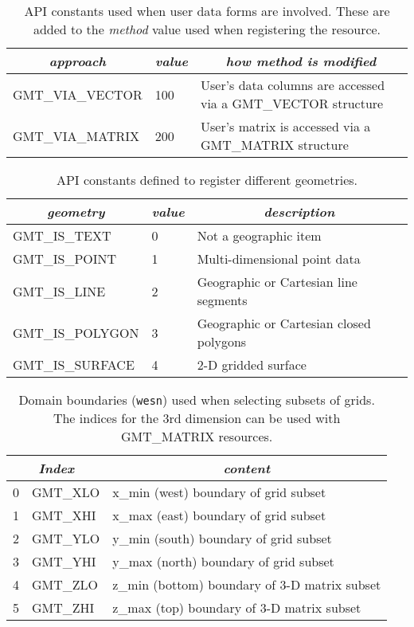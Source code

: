 \documentclass[11pt]{report}
\begin{document}
\begin{table}[h]
\small
\centering
\begin{tabular}{|l|l|l|} \hline
\multicolumn{1}{|c|}{\emph{approach}} & \multicolumn{1}{c|}{\emph{value}} & \multicolumn{1}{c|}{\emph{how method is modified}} \\ \hline
GMT\_VIA\_VECTOR	&	100	&       User's data columns are accessed via a GMT\_VECTOR structure \\ \hline
GMT\_VIA\_MATRIX	&	200	&       User's matrix is accessed via a GMT\_MATRIX structure \\ \hline
\end{tabular}
\caption{API constants used when user data forms are involved.  These are added
to the \emph{method} value used when registering the resource.}
\label{tbl:via}
\end{table}

\begin{table}[h]
\small
\centering
\begin{tabular}{|l|l|l|} \hline
\multicolumn{1}{|c|}{\emph{geometry}} & \multicolumn{1}{c|}{\emph{value}} & \multicolumn{1}{c|}{\emph{description}} \\ \hline
GMT\_IS\_TEXT		&	0	&       Not a geographic item \\ \hline
GMT\_IS\_POINT		&	1	&       Multi-dimensional point data \\ \hline
GMT\_IS\_LINE		&	2	&       Geographic or Cartesian line segments \\ \hline
GMT\_IS\_POLYGON	&	3	&       Geographic or Cartesian closed polygons \\ \hline
GMT\_IS\_SURFACE	&	4	&       2-D gridded surface \\ \hline
\end{tabular}
\caption{API constants defined to register different geometries.}
\label{tbl:geometry}
\end{table}

\begin{table}[h]
\small
\centering
\begin{tabular}{|c|l|l|} \hline
\multicolumn{2}{|c|}{\emph{Index}} & \multicolumn{1}{c|}{\emph{content}} \\ \hline
0 & GMT\_XLO	&       x\_min (west) boundary of grid subset  \\ \hline
1 & GMT\_XHI	&       x\_max (east) boundary of grid subset  \\ \hline
2 & GMT\_YLO	&       y\_min (south) boundary of grid subset  \\ \hline
3 & GMT\_YHI	&       y\_max (north) boundary of grid subset  \\ \hline
4 & GMT\_ZLO	&       z\_min (bottom) boundary of 3-D matrix subset  \\ \hline
5 & GMT\_ZHI	&       z\_max (top) boundary of 3-D matrix subset  \\ \hline
\end{tabular}
\caption{Domain boundaries (\texttt{wesn}) used when selecting subsets of grids.  The indices for
the 3rd dimension can be used with GMT\_MATRIX resources.}
\label{tbl:wesn}
\end{table}
\end{document}

